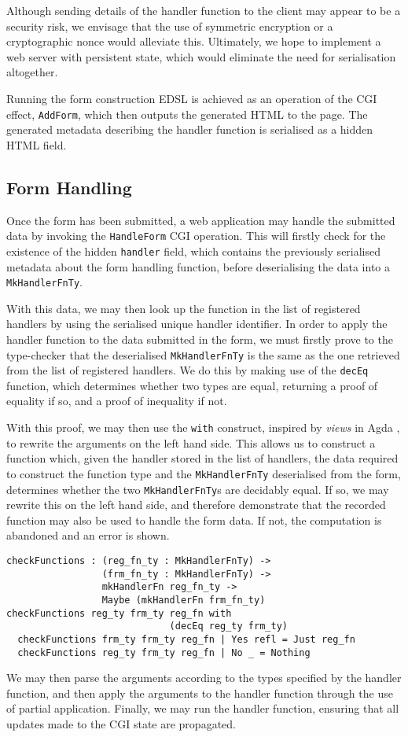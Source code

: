 \documentclass[preprint]{sigplanconf}
\begin{document}
Although sending details of the handler function to the client may appear to be a security risk, we envisage that the use of symmetric encryption or a cryptographic nonce would alleviate this. Ultimately, we hope to implement a web server with persistent state, which would eliminate the need for serialisation altogether.

Running the form construction EDSL is achieved as an operation of the CGI effect, \texttt{AddForm}, which then outputs the generated HTML to the page. The generated metadata describing the handler function is serialised as a hidden HTML field.

\subsection{Form Handling}
\label{formhandling}
Once the form has been submitted, a web application may handle the submitted data by invoking the \texttt{HandleForm} CGI operation. This will firstly check for the existence of the hidden \texttt{handler} field, which contains the previously serialised metadata about the form handling function, before deserialising the data into a \texttt{MkHandlerFnTy}. 

With this data, we may then look up the function in the list of registered handlers by using the serialised unique handler identifier. In order to apply the handler function to the data submitted in the form, we must firstly prove to the type-checker that the deserialised \texttt{MkHandlerFnTy} is the same as the one retrieved from the list of registered handlers. We do this by making use of the \texttt{decEq} function, which determines whether two types are equal, returning a proof of equality if so, and a proof of inequality if not.

With this proof, we may then use the \texttt{with} construct, inspired by \textit{views} in Agda \cite{mcbride.mckinna:viewfromleft}, to rewrite the arguments on the left hand side. This allows us to construct a function which, given the handler stored in the list of handlers, the data required to construct the function type and the \texttt{MkHandlerFnTy} deserialised from the form, determines whether the two \texttt{MkHandlerFnTy}s are decidably equal. If so, we may rewrite this on the left hand side, and therefore demonstrate that the recorded function may also be used to handle the form data. If not, the computation is abandoned and an error is shown. %
{\small
\begin{verbatim}
checkFunctions : (reg_fn_ty : MkHandlerFnTy) -> 
                 (frm_fn_ty : MkHandlerFnTy) -> 
                 mkHandlerFn reg_fn_ty -> 
                 Maybe (mkHandlerFn frm_fn_ty)
checkFunctions reg_ty frm_ty reg_fn with 
                             (decEq reg_ty frm_ty)
  checkFunctions frm_ty frm_ty reg_fn | Yes refl = Just reg_fn
  checkFunctions reg_ty frm_ty reg_fn | No _ = Nothing
\end{verbatim}}
We may then parse the arguments according to the types specified by the handler function, and then apply the arguments to the handler function through the use of partial application. Finally, we may run the handler function, ensuring that all updates made to the CGI state are propagated.
\end{document}
